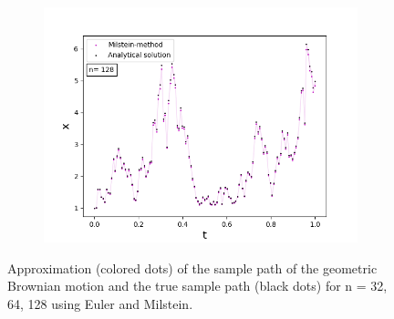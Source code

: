 \begin{figure}[!h]
\begin{subfigure}{0.49\linewidth}
   \end{subfigure}
   \begin{subfigure}{0.49\linewidth} \centering
     \includegraphics[scale=0.4]{Content/Graphics/Appendix/6gbm2}
   \end{subfigure}
\caption{Approximation (colored dots) of the sample path of the geometric Brownian motion and the true sample path (black dots) for n = 32, 64, 128 using Euler and Milstein.}
\end{figure}


